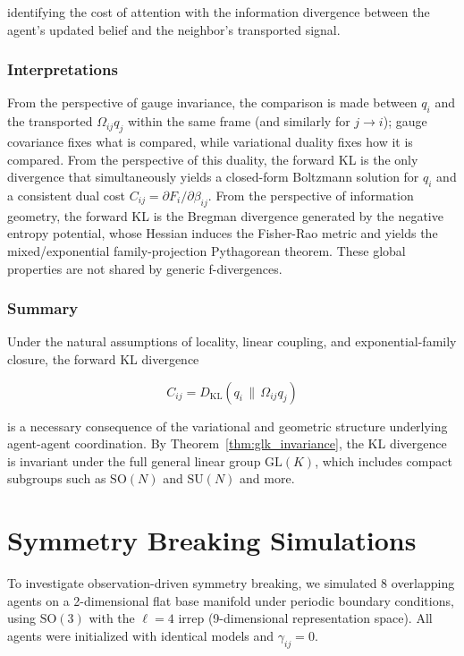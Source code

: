 \documentclass[twoside,11pt]{article}
\begin{document}
identifying the cost of attention with the information divergence between the agent's updated belief and the neighbor's transported signal.

\subsubsection{Interpretations}
From the perspective of gauge invariance, the comparison is made between $q_i$ and the transported $\Omega_{ij}q_j$ within the same frame (and similarly for $j \rightarrow i$); gauge covariance fixes what is compared, while variational duality fixes how it is compared. From the perspective of this duality, the forward KL is the only divergence that simultaneously yields a closed-form Boltzmann solution for $q_i$ and a consistent dual cost $C_{ij} = \partial F_i / \partial \beta_{ij}$. From the perspective of information geometry, the forward KL is the Bregman divergence generated by the negative entropy potential, whose Hessian induces the Fisher-Rao metric and yields the  mixed/exponential family-projection Pythagorean theorem. These global properties are not shared by generic f-divergences.

\subsubsection{Summary}
Under the natural assumptions of locality, linear coupling, and exponential-family closure, the forward KL divergence

\[
\boxed{
C_{ij}=D_{\mathrm{KL}}(q_i \,\|\, \Omega_{ij} q_j)}
\]

is a necessary consequence of the variational and geometric structure underlying agent-agent coordination. By Theorem~\ref{thm:glk_invariance}, the KL divergence is invariant under the full general linear group $\mathrm{GL}(K)$, which includes compact subgroups such as $\mathrm{SO}(N)$ and $\mathrm{SU}(N)$ and more.


\section{Symmetry Breaking Simulations}
\label{app:symmetry_breaking_sims}

To investigate observation-driven symmetry breaking, we simulated 8 overlapping agents on a 2-dimensional flat base manifold under periodic boundary conditions, using $\mathrm{SO}(3)$ with the $\ell = 4$ irrep (9-dimensional representation space). All agents were initialized with identical models and $\gamma_{ij} = 0$.
\end{document}
